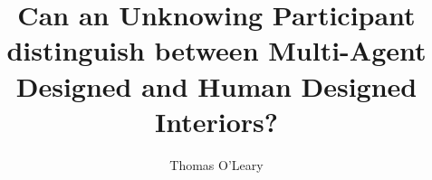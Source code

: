 \documentclass[journal]{IEEEtran}
\begin{document}
\title{Can an Unknowing Participant distinguish between Multi-Agent Designed and Human Designed Interiors?}

\author{Thomas O'Leary}

\maketitle









%







\end{document}
